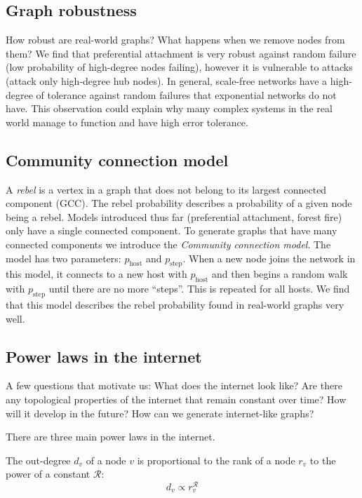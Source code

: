 \subsection{Graph robustness}
\bigskip

How robust are real-world graphs? What happens when we remove nodes from them? We find that preferential attachment is very robust against random failure (low probability of high-degree nodes failing), however it is vulnerable to attacks (attack only high-degree hub nodes). In general, scale-free networks have a high-degree of tolerance against random failures that exponential networks do not have. This observation could explain why many complex systems in the real world manage to function and have high error tolerance.

\subsection{Community connection model}
\bigskip

A \emph{rebel} is a vertex in a graph that does not belong to its largest connected component (GCC). The rebel probability describes a probability of a given node being a rebel. Models introduced thus far (preferential attachment, forest fire) only have a single connected component. To generate graphs that have many connected components we introduce the \emph{Community connection model}. The model has two parameters: $p_\text{host}$ and $p_\text{step}$. When a new node joins the network in this model, it connects to a new host with $p_\text{host}$ and then begins a random walk with $p_\text{step}$ until there are no more ``steps''. This is repeated for all hosts. We find that this model describes the rebel probability found in real-world graphs very well.

\subsection{Power laws in the internet}
\bigskip

A few questions that motivate us: What does the internet look like? Are there any topological properties of the internet that remain constant over time? How will it develop in the future? How can we generate internet-like graphs?

There are three main power laws in the internet.

\begin{theorem}
The out-degree $d_v$ of a node $v$ is proportional to the rank of a node $r_v$ to the power of a constant $\mathcal{R}$:
$$
d_v \propto r_v^\mathcal{R}
$$
\end{theorem}

